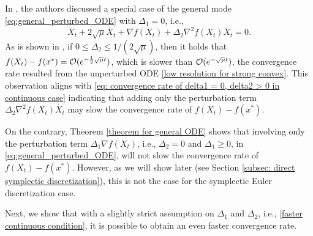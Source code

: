 \documentclass[11pt]{article}
\newcommand{\1}{\mathbf 1}
\numberwithin{equation}{section}
\begin{document}
\begin{remark}
In \cite{Attouch_2022_first-order}, the authors discussed a special case of the general mode \eqref{eq:general_perturbed_ODE} with $\Delta_1 = 0$, i.e.,
	\begin{equation}
		\label{first order ODE}\ddot{X_t}+2\sqrt{\mu}\dot{X_t}+\nabla f(X_t)+\Delta_2\nabla^2 f(X_t)\dot{X_t}=0.
	\end{equation}
As is shown in \cite[Theorem 7(i)]{Attouch_2022_first-order}, if $0\leqslant \Delta_2 \leqslant {1}/{(2\sqrt{\mu})}$, then it holds that  $f(X_t)-f(x^*)={\cal O}(e^{-\frac{1}{2}\sqrt{\mu}t})$, which is slower than ${\cal O}(e^{-\sqrt{\mu}t})$, the convergence rate resulted from the unperturbed ODE \eqref{low resolution for strong convex}. This observation aligns with \eqref{eq: convergence rate of delta1 = 0, delta2 > 0 in continuous case} indicating that adding only the perturbation term $\Delta_2\nabla^2 f(X_t)\dot{X_t}$ may slow the convergence rate of $f(X_t)-f(x^*)$. 

On the contrary,  Theorem \ref{theorem for general ODE} shows that involving only the perturbation term $\Delta_1 \nabla f(X_t)$, i.e., $\Delta_2 = 0$ and $\Delta_1 \geqslant 0$, in \eqref{eq:general_perturbed_ODE}, will not slow the convergence rate of $f(X_t)-f(x^*)$. However, as we will show later (see Section \ref{subsec: direct symplectic discretization}), this is not the case for the symplectic Euler discretization case.

\end{remark}

Next, we show that with a slightly strict assumption on $\Delta_1$ and $\Delta_2$, i.e., \eqref{faster continuous condition}, it is possible to obtain an even faster convergence rate.
\end{document}
